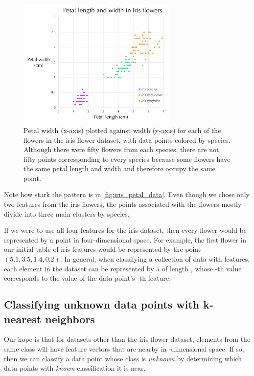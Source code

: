 \begin{figure}[h]
\centering
\mySfFamily
\includegraphics[width = 0.7\textwidth]{../images/iris_petal_data.png}
\caption{Petal width (x-axis) plotted against width (y-axis) for each of the flowers in the iris flower dataset, with data points colored by species. Although there were fifty flowers from each species, there are not fifty points corresponding to every species because some flowers have the same petal length and width and therefore occupy the same point.}
\label{fig:iris_petal_data}
\end{figure}

Note how stark the pattern is in \autoref{fig:iris_petal_data}. Even though we chose only two features from the iris flowers, the points associated with the flowers mostly divide into three main clusters by species.

If we were to use all four features for the iris dataset, then every flower would be represented by a point in four-dimensional space. For example, the first flower in our initial table of iris features would be represented by the point $(5.1, 3.5, 1.4, 0.2)$. In general, when classifying a collection of data with  features, each element in the dataset can be represented by a  of length , whose -th value corresponds to the value of the data point's -th feature.

\FloatBarrier
{}
\subsection{Classifying unknown data points with k-nearest neighbors}

Our hope is that for datasets other than the iris flower dataset, elements from the same class will have feature vectors that are nearby in -dimensional space. If so, then we can classify a data point whose class is \textit{unknown} by determining which data points with \textit{known} classification it is near.\\


